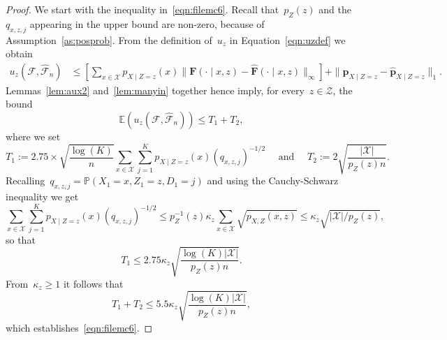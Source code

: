 \documentclass[11pt, a4paper]{article}
\theoremstyle{definition}
\begin{document}
\begin{proof}
We start with the inequality in~\eqref{eqn:filemc6}. Recall that~$p_Z(z)$ and the~$q_{x,z,j}$ appearing in the upper bound are non-zero, because of Assumption~\ref{as:posprob}. From the definition of~$u_z$ in Equation~\eqref{eqn:uzdef} we obtain
\begin{equation}
\begin{aligned}\label{eqn:inrecuz}
u_z(\mathcal{F}, \hat{\mathcal{F}}_n) &\leq \left[\sum_{x \in \mathcal{X}} p_{X\mid Z= z}(x)\|\bm{F}(\cdot \mid  x, z) - \hat{\bm{F}}(\cdot \mid  x, z)\|_{\infty} \right] + \|\bm{p}_{X\mid Z=z} - \hat{\bm{p}}_{X\mid Z=z}\|_1.
\end{aligned}
\end{equation}
Lemmas~\ref{lem:aux2} and~\ref{lem:manyin} together hence imply, for every~$z \in \mathcal{Z}$, the bound
%
\begin{equation}\label{eqn:upl}
\mathbb{E}\left(u_z(\mathcal{F}, \hat{\mathcal{F}}_n)\right) \leq T_1 + T_2,
\end{equation}
where we set 
%
\begin{equation*}
T_1 := 2.75 \times \sqrt{\frac{\log(K)}{n}} \sum_{x \in \mathcal{X}} \sum_{j = 1}^K p_{X\mid Z=z}(x)  (q_{x,z,j})^{-1/2} \quad \text{ and } \quad 
T_2 := 2 \sqrt{ \frac{|\mathcal{X}|}{p_Z(z) n}}.
\end{equation*}
%
Recalling~$q_{x,z,j} = \mathbb{P}(X_1 = x, Z_1 = z, D_1 = j)$ and using the Cauchy-Schwarz inequality we get
%
\begin{equation*}
\sum_{x \in \mathcal{X}} \sum_{j = 1}^K p_{X\mid Z=z}(x) (q_{x,z,j})^{-1/2} \leq p^{-1}_{Z}(z) \kappa_z \sum_{x \in \mathcal{X}} \sqrt{p_{X,Z}(x, z)} \leq  \kappa_z \sqrt{|\mathcal{X}|/p_{Z}(z)},
\end{equation*}
%
so that
%
\begin{equation*}
T_1 \leq 2.75 \kappa_z  \sqrt{ \frac{\log(K)|\mathcal{X}|}{p_{Z}(z)n}}.
\end{equation*}
%
From~$\kappa_z \geq 1$ it follows that $$T_1 + T_2 \leq 5.5 \kappa_z \sqrt{ \frac{\log(K)|\mathcal{X}|}{p_{Z}(z)n}},$$ which establishes~\eqref{eqn:filemc6}. 


\end{proof}
\end{document}
